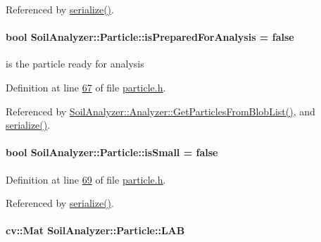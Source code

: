 Referenced by \hyperlink{particle_8h_source_l00083}{serialize()}.

\hypertarget{class_soil_analyzer_1_1_particle_aead45a461f496be6fa4a200fb0d8a150}{}
\paragraph[{is\+Prepared\+For\+Analysis}]{\setlength{\rightskip}{0pt plus 5cm}bool Soil\+Analyzer\+::\+Particle\+::is\+Prepared\+For\+Analysis = false}\label{class_soil_analyzer_1_1_particle_aead45a461f496be6fa4a200fb0d8a150}
is the particle ready for analysis 

Definition at line \hyperlink{particle_8h_source_l00067}{67} of file \hyperlink{particle_8h_source}{particle.\+h}.



Referenced by \hyperlink{analyzer_8cpp_source_l00322}{Soil\+Analyzer\+::\+Analyzer\+::\+Get\+Particles\+From\+Blob\+List()}, and \hyperlink{particle_8h_source_l00083}{serialize()}.

\hypertarget{class_soil_analyzer_1_1_particle_a56c5d77365850a29011cf069cce90445}{}
\paragraph[{is\+Small}]{\setlength{\rightskip}{0pt plus 5cm}bool Soil\+Analyzer\+::\+Particle\+::is\+Small = false}\label{class_soil_analyzer_1_1_particle_a56c5d77365850a29011cf069cce90445}


Definition at line \hyperlink{particle_8h_source_l00069}{69} of file \hyperlink{particle_8h_source}{particle.\+h}.



Referenced by \hyperlink{particle_8h_source_l00083}{serialize()}.

\hypertarget{class_soil_analyzer_1_1_particle_a57e00853b68506aaaa000e78316d84a1}{}
\paragraph[{L\+A\+B}]{\setlength{\rightskip}{0pt plus 5cm}cv\+::\+Mat Soil\+Analyzer\+::\+Particle\+::\+L\+A\+B\hspace{0.3cm}{\ttfamily [private]}}\label{class_soil_analyzer_1_1_particle_a57e00853b68506aaaa000e78316d84a1}


